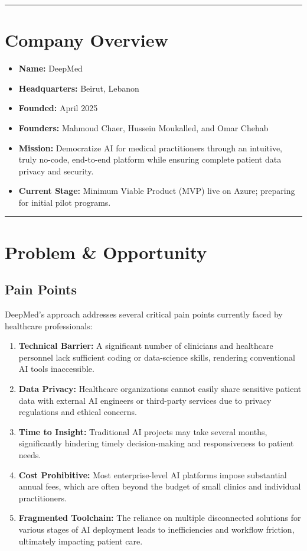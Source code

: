 \documentclass[11pt,a4paper]{article}
\begin{document}
\bigskip\hrule\bigskip

\section{Company Overview}
\begin{itemize}
  \item \textbf{Name:} DeepMed
  \item \textbf{Headquarters:} Beirut, Lebanon
  \item \textbf{Founded:} April 2025
  \item \textbf{Founders:} Mahmoud Chaer, Hussein Moukalled, and Omar Chehab
  \item \textbf{Mission:} Democratize AI for medical practitioners through an intuitive, truly no-code, end-to-end platform while ensuring complete patient data privacy and security.
  \item \textbf{Current Stage:} Minimum Viable Product (MVP) live on Azure; preparing for initial pilot programs.
\end{itemize}

\bigskip\hrule\bigskip

\section{Problem \& Opportunity}

\subsection{Pain Points}
DeepMed's approach addresses several critical pain points currently faced by healthcare professionals:
\begin{enumerate}
  \item \textbf{Technical Barrier:} A significant number of clinicians and healthcare personnel lack sufficient coding or data-science skills, rendering conventional AI tools inaccessible.
  \item \textbf{Data Privacy:} Healthcare organizations cannot easily share sensitive patient data with external AI engineers or third-party services due to privacy regulations and ethical concerns.
  \item \textbf{Time to Insight:} Traditional AI projects may take several months, significantly hindering timely decision-making and responsiveness to patient needs.
  \item \textbf{Cost Prohibitive:} Most enterprise-level AI platforms impose substantial annual fees, which are often beyond the budget of small clinics and individual practitioners.
  \item \textbf{Fragmented Toolchain:} The reliance on multiple disconnected solutions for various stages of AI deployment leads to inefficiencies and workflow friction, ultimately impacting patient care.
\end{enumerate}
\end{document}
